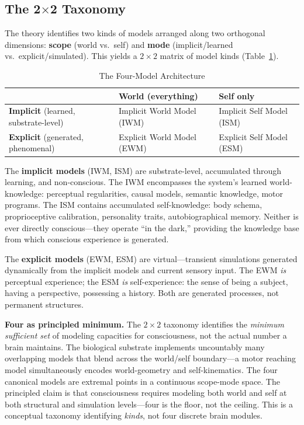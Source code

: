 \documentclass[11pt]{article}
\begin{document}
\subsection{The 2$\times$2 Taxonomy}

The theory identifies two kinds of models arranged along two orthogonal dimensions: \textbf{scope} (world vs.\ self) and \textbf{mode} (implicit/learned vs.\ explicit/simulated). This yields a $2 \times 2$ matrix of model kinds (Table~\ref{tab:taxonomy}).

\begin{table}[h]
\centering
\caption{The Four-Model Architecture}
\label{tab:taxonomy}
\begin{tabular}{@{}lll@{}}
\toprule
 & \textbf{World (everything)} & \textbf{Self only} \\
\midrule
\textbf{Implicit} (learned, substrate-level) & Implicit World Model (IWM) & Implicit Self Model (ISM) \\
\textbf{Explicit} (generated, phenomenal) & Explicit World Model (EWM) & Explicit Self Model (ESM) \\
\bottomrule
\end{tabular}
\end{table}

The \textbf{implicit models} (IWM, ISM) are substrate-level, accumulated through learning, and non-conscious. The IWM encompasses the system's learned world-knowledge: perceptual regularities, causal models, semantic knowledge, motor programs. The ISM contains accumulated self-knowledge: body schema, proprioceptive calibration, personality traits, autobiographical memory. Neither is ever directly conscious---they operate ``in the dark,'' providing the knowledge base from which conscious experience is generated.

The \textbf{explicit models} (EWM, ESM) are virtual---transient simulations generated dynamically from the implicit models and current sensory input. The EWM \emph{is} perceptual experience; the ESM \emph{is} self-experience: the sense of being a subject, having a perspective, possessing a history. Both are generated processes, not permanent structures.

\textbf{Four as principled minimum.} The $2 \times 2$ taxonomy identifies the \emph{minimum sufficient set} of modeling capacities for consciousness, not the actual number a brain maintains. The biological substrate implements uncountably many overlapping models that blend across the world/self boundary---a motor reaching model simultaneously encodes world-geometry and self-kinematics. The four canonical models are extremal points in a continuous scope-mode space. The principled claim is that consciousness requires modeling both world and self at both structural and simulation levels---four is the floor, not the ceiling. This is a conceptual taxonomy identifying \emph{kinds}, not four discrete brain modules.
\end{document}
